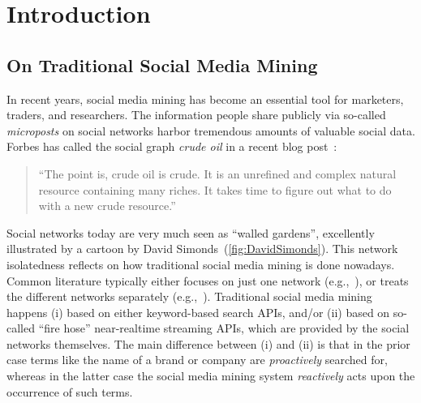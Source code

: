 \documentclass{iosart2c}
\begin{document}

\section{Introduction} \label{sec:introduction}
\subsection{On Traditional Social Media Mining}
In recent years, social media mining has become an essential tool for marketers, traders, and researchers.
The information people share publicly via so-called \emph{microposts} on social networks harbor tremendous amounts of valuable social data.
Forbes has called the social graph \emph{crude oil} in a recent blog post~\cite{ForbesPost}:
\begin{quotation}
``The point is, crude oil is crude. It is an unrefined and complex natural resource containing many riches. It takes time to figure out what to do with a new crude resource.''
\end{quotation}
Social networks today are very much seen as ``walled gardens'', excellently illustrated by a cartoon by David Simonds~(\autoref{fig:DavidSimonds}).
This network isolatedness reflects on how traditional social media mining is done nowadays.
Common literature typically either focuses on just one network (e.g.,~\cite{russell201121}), or treats the different networks separately (e.g.,~\cite{russell2011mining}).
Traditional social media mining happens (i) based on either keyword-based search APIs, and/or (ii) based on so-called ``fire hose'' near-realtime streaming APIs, which are provided by the social networks themselves.
The main difference between (i) and (ii) is that in the prior case terms like the name of a brand or company are \emph{proactively} searched for, whereas in the latter case the social media mining system \emph{reactively} acts upon the occurrence of such terms.
\end{document}

